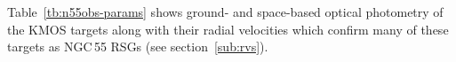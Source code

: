 

Table~\ref{tb:n55obs-params} shows ground- and space-based optical photometry of the KMOS targets along with their radial velocities which confirm many of these targets as NGC\,55 RSGs (see section~\ref{sub:rvs}).



